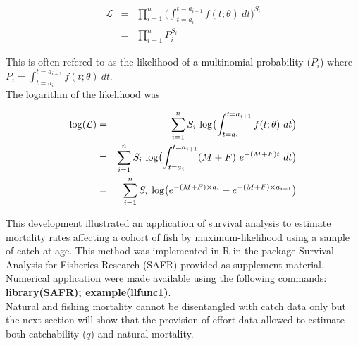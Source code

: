 \begin{eqnarray}
\mathcal{L}  &=& \prod_{i=1}^{n} \bigl ( \int_{t=a_{i}}^{t=a_{i+1}} f(t; \theta) \ dt \bigr ) ^ {S_{i}} \\
            &=& \prod_{i=1}^{n} P_{i} ^ {S_{i}}
\end{eqnarray}

This is often refered to as the likelihood of a multinomial probability ($P_{i}$) where $P_{i}=\int_{t=a_{i}}^{t=a_{i+1}} f(t; \theta) \ dt$.\\






The logarithm of the likelihood was

\begin{eqnarray}
{\rm log}(\mathcal{L}) &=& \sum_{i=1}^{n} S_{i} \ {\rm log} \bigl ( \int_{t=a_{i}}^{t=a_{i+1}} f(t; \theta) \ dt \bigr ) \\
                       &=& \sum_{i=1}^{n} S_{i} \ {\rm log} \bigl ( \int_{t=a_{i}}^{t=a_{i+1}} (M + F) \ e^{-(M+F)t} \ dt \bigr ) \\
                       &=& \sum_{i=1}^{n} S_{i} \ {\rm log} \bigl ( e^{-(M+F) \times a_{i}} - e^{-(M+F) \times a_{i+1}} \bigr ) \\
\end{eqnarray}

This development illustrated an application of survival analysis to estimate mortality rates affecting a cohort of fish by maximum-likelihood using a sample of catch at age. This method was implemented in R \citep{R} in the package Survival Analysis for Fisheries Research (SAFR) provided as supplement material. Numerical application were made available using the following commands: {\bf library(SAFR); example(llfunc1)}.\\

Natural and fishing mortality cannot be disentangled with catch data only but the next section will show that the provision of effort data allowed to estimate both catchability ($q$) and natural mortality. 
